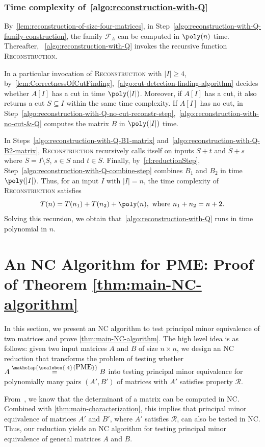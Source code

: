 \documentclass[11pt,letterpaper]{article}
\newcommand{\comp}[1]{\overline{#1}}
\newcommand{\PME}{\stackrel{\mathclap{\scalebox{.4}{\mbox{PME}}}}{=}}
\newcommand{\prop}{\mathcal{R}}
\newcommand{\submatrixfamily}[1]{\mathcal{F}_{#1}}
\begin{document}
{{{\subsubsection{Time complexity of~\cref{algo:reconstruction-with-Q}} By~\cref{lem:reconstruction-of-size-four-matrices}, in Step~\ref{algo:reconstruction-with-Q-family-construction}, the family $\submatrixfamily{A}$ can be computed in $\poly(n)$ time. Thereafter, ~\cref{algo:reconstruction-with-Q} invokes the recursive function \textsc{Reconstruction}. 

In a particular invocation of \textsc{Reconstruction} with $|I|\geq 4$, by~\cref{lem:CorrectnessOfCutFinding},~\cref{algo:cut-detection-finding-algorithm} decides whether $A[I]$ has a cut in time $\poly(|I|)$. Moreover, if $A[I]$ has a cut, it also returns a cut $S\subseteq I$ within the same time complexity. If $A[I]$ has no cut, in Step~\ref{algo:reconstruction-with-Q-no-cut-reconstr-step},~\cref{algo:reconstruction-with-no-cut-&-Q} computes the matrix $B$ in $\poly(|I|)$ time. 

In Steps~\ref{algo:reconstruction-with-Q-B1-matrix} and~\ref{algo:reconstruction-with-Q-B2-matrix}, \textsc{Reconstruction} recursively calls itself on inputs $S+t$ and $\comp{S}+s$ where $\comp{S}=I\setminus S$, $s\in S$ and $t\in \comp{S}$. Finally, by~\cref{cl:reductionStep}, Step~\ref{algo:reconstruction-with-Q-combine-step} combines $B_1$ and $B_2$ in time $\poly(|I|)$. Thus, for an input $I$ with $|I|=n$, the time complexity of \textsc{Reconstruction} satisfies $$T(n)=T(n_1)+T(n_2)+\poly(n), \text{ where } n_1+n_2=n+2.$$
Solving this recursion, we obtain that~\cref{algo:reconstruction-with-Q} runs in time polynomial in $n$.


\section{An NC Algorithm for PME: Proof of Theorem \ref{thm:main-NC-algorithm}}\label{sec:NC-algo-for-PME}
In this section, we present an NC algorithm to test principal minor equivalence of two matrices and prove \cref{thm:main-NC-algorithm}. The high level idea is as follows:  given two input matrices $A$ and $B$ of size $n \times n$, we design an NC reduction that transforms the problem of testing whether $A \PME B$ into testing principal minor equivalence for polynomially many pairs $(A', B')$ of matrices with $ A'$ satisfies property $\prop$. 

From~\cite{Csanky76, Borodin83}, we know that the determinant of a matrix can be computed in NC. Combined with \cref{thm:main-characterization}, this implies that principal minor equivalence of matrices $A'$ and $B'$, where $A'$ satisfies $\prop$, can also be tested in NC. Thus, our reduction yields an NC algorithm for testing principal minor equivalence of general matrices $A$ and $B$. 

}}}
\end{document}
